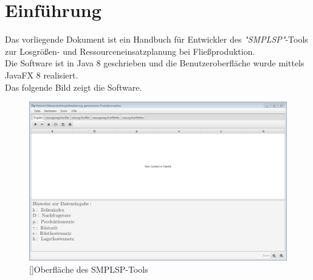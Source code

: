 \documentclass[12pt,a4paper, listof=entryprefix, bibliography=totocnumbered,toc=listofnumbered,lof=listofnumbered]{scrartcl}
\newcounter{verzeichnis}
\begin{document}
\singlespacing %
\setcounter{section}{0}
\setcounter{page}{1}

\tableofcontents %
\pagebreak

\onehalfspacing %
\renewcommand{\thesection}{\arabic{section}} %
\setcounter{page}{1}	%
\setcounter{section}{0}
\renewcommand{\sectionmark}[1]{\markright{#1}} %
\renewcommand{\subsectionmark}[1]{}            %
\renewcommand{\subsubsectionmark}[1]{}         %
\rhead{\rightmark}                             %

\section{Einführung}
Das vorliegende Dokument ist ein Handbuch für Entwickler des \textit{"\gls{SMPLSP}"}-Tools zur Losgrößen- und Ressourceneinsatzplanung bei Fließproduktion. 
\\
Die Software ist in Java 8 geschrieben und die Benutzeroberfläche wurde mittels JavaFX 8 realisiert.
\\
Das folgende Bild zeigt die Software.

\begin{figure}[H]
	\centering
	\includegraphics[width=1.0\linewidth]{Bilder/smplsp.png} 
	[]{Oberfläche des SMPLSP-Tools}
	\label{fig:osgi}
\end{figure}
\end{document}
